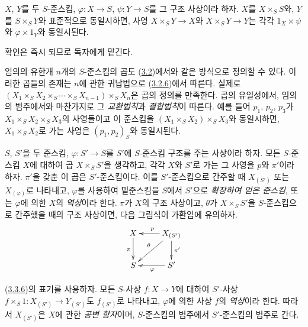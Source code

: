 \begin{corollary}[3.3.4]
\label{I.3.3.4-ko}
$X$, $Y$를 두 $S$-준스킴, $\varphi:X\to S$, $\psi:Y\to S$를 그
구조 사상이라 하자. $X$를 $X\times_S S$와, $Y$를 $S\times_S Y$와
표준적으로 동일시하면, 사영 $X\times_S Y\to X$와
$X\times_S Y\to Y$는 각각 $1_X\times\psi$와
$\varphi\times1_Y$와 동일시된다.
\end{corollary}

확인은 즉시 되므로 독자에게 맡긴다.

\begin{env}[3.3.5]
\label{I.3.3.5-ko}
임의의 유한개 $n$개의 $S$-준스킴의 곱도
(\hyperref[subsection:I.3.2-ko]{3.2})에서와 같은 방식으로 정의할
수 있다.
이러한 곱들의 존재는 $n$에 관한 귀납법으로
(\hyperref[I.3.2.6-ko]{3.2.6})에서 따른다. 실제로
$(X_1\times_S X_2\times_S\cdots\times_S X_{n-1})\times_S X_n$은
곱의 정의를 만족한다. 곱의 유일성에서, 임의의 범주에서와 마찬가지로
그 \emph{교환법칙}과 \emph{결합법칙}이 따른다. 예를 들어
$p_1$, $p_2$, $p_3$가 $X_1\times_S X_2\times_S X_3$의 사영들이고
이 준스킴을 $(X_1\times_S X_2)\times_S X_3$와 동일시하면,
$X_1\times_S X_2$로 가는 사영은 $(p_1,p_2)_S$와 동일시된다.
\end{env}

\begin{env}[3.3.6]
\label{I.3.3.6-ko}
$S$, $S'$을 두 준스킴, $\varphi:S'\to S$를 $S'$에 $S$-준스킴
구조를 주는 사상이라 하자. 모든 $S$-준스킴 $X$에 대하여 곱
$X\times_S S'$을 생각하고, 각각 $X$와 $S'$로 가는 그 사영을
$p$와 $\pi'$이라 하자. $\pi'$을 갖춘 이 곱은 $S'$-준스킴이다.
이를 $S'$-준스킴으로 간주할 때 $X_{(S')}$ 또는
$X_{(\varphi)}$로 나타내고, $\varphi$를 사용하여 밑준스킴을
$S$에서 $S'$으로 \emph{확장하여 얻은 준스킴}, 또는 $\varphi$에
의한 $X$의 \emph{역상}이라 한다. $\pi$가 $X$의 구조 사상이고,
$\theta$가 $X\times_S S'$을 $S$-준스킴으로 간주했을 때의 구조
사상이면, 다음 그림식이 가환임에 유의하자.
\label{I.3.3.6.base-change-diagram-ko}
\[
  \xymatrix{
    X\ar[d]_{\pi} &
    X_{(S')}\ar[l]_{p}\ar[ld]_{\theta}\ar[d]^{\pi'}\\
    S & S'\ar[l]^{\varphi}
  }
\]
\end{env}

\begin{env}[3.3.7]
\label{I.3.3.7-ko}
(\hyperref[I.3.3.6-ko]{3.3.6})의 표기를 사용하자. 모든 $S$-사상
$f:X\to Y$에 대하여 $S'$-사상
$f\times_S1:X_{(S')}\to Y_{(S')}$도 $f_{(S')}$로 나타내고,
$\varphi$에 의한 사상 $f$의 \emph{역상}이라 한다. 따라서
$X_{(S')}$은 $X$에 관한 \emph{공변 함자}이며, $S$-준스킴의
범주에서 $S'$-준스킴의 범주로 간다.
\end{env}

